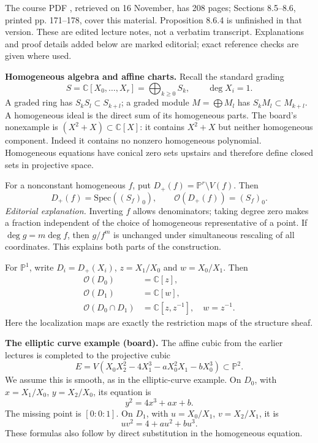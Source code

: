 The course PDF
\cite{vanEkerenHomologicalAlgebra2026},
retrieved on 16 November, has 208 pages;
Sections 8.5--8.6, printed pp. 171--178,
cover this material. Proposition 8.6.4 is
unfinished in that version. These are
edited lecture notes, not a verbatim
transcript. Explanations and proof details
added below are marked editorial; exact
reference checks are given where used.

\medskip\noindent
{\bf Homogeneous algebra and affine charts.}
Recall the standard grading
$$
S=\mathbb{C}[X_0,\ldots,X_r]
=\bigoplus_{k\geq0}S_k,
\qquad \deg X_i=1.
$$
A graded ring has $S_kS_l\subset S_{k+l}$;
a graded module $M=\bigoplus M_l$ has
$S_kM_l\subset M_{k+l}$. A homogeneous
ideal is the direct sum of its homogeneous
parts. The board's nonexample is
$(X^2+X)\subset\mathbb{C}[X]$: it contains
$X^2+X$ but neither homogeneous component.
Indeed it contains no nonzero homogeneous
polynomial. Homogeneous equations have
conical zero sets upstairs and therefore
define closed sets in projective space.

For a nonconstant homogeneous $f$, put
$D_+(f)=\mathbb{P}^r\setminus V(f)$. Then
$$
D_+(f)=\mathrm{Spec}((S_f)_0),
\qquad
\mathcal{O}(D_+(f))=(S_f)_0.
$$
\textit{Editorial explanation.} Inverting
$f$ allows denominators; taking degree zero
makes a fraction independent of the choice
of homogeneous representative of a point.
If $\deg g=m\deg f$, then $g/f^m$ is
unchanged under simultaneous rescaling of
all coordinates. This explains both parts
of the construction.

For $\mathbb{P}^1$, write $D_i=D_+(X_i)$,
$z=X_1/X_0$ and $w=X_0/X_1$. Then
$$
\begin{aligned}
\mathcal{O}(D_0)&=\mathbb{C}[z],\\
\mathcal{O}(D_1)&=\mathbb{C}[w],\\
\mathcal{O}(D_0\cap D_1)
&=\mathbb{C}[z,z^{-1}],\quad w=z^{-1}.
\end{aligned}
$$
Here the localization maps are exactly the
restriction maps of the structure sheaf.

\medskip\noindent
{\bf The elliptic curve example (board).}
The affine cubic from the earlier lectures
is completed to the projective cubic
$$
E=V(X_0X_2^2-4X_1^3-aX_0^2X_1-bX_0^3)
\subset\mathbb{P}^2.
$$
We assume this is smooth, as in the
elliptic-curve example. On $D_0$, with
$x=X_1/X_0$, $y=X_2/X_0$, its equation is
$$
y^2=4x^3+ax+b.
$$
The missing point is $[0:0:1]$. On $D_1$,
with $u=X_0/X_1$, $v=X_2/X_1$, it is
$$
uv^2=4+au^2+bu^3.
$$
These formulas also follow by direct
substitution in the homogeneous equation.

